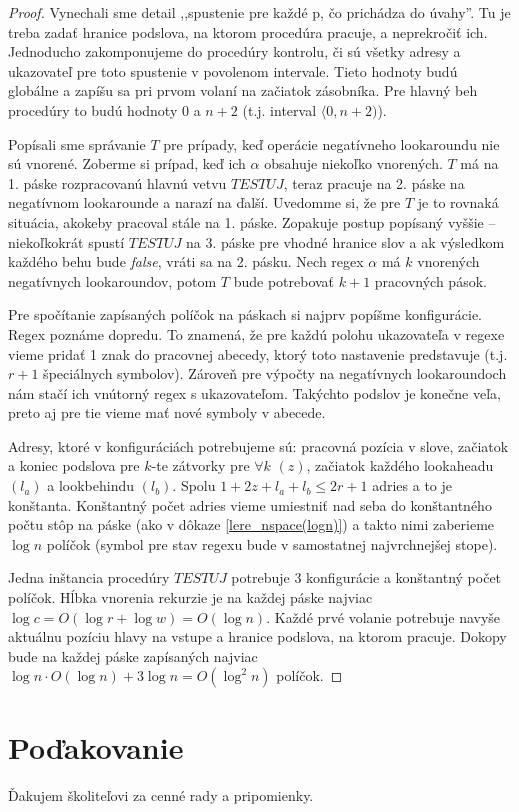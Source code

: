 \documentclass{svk_long_sk}
\begin{document}
\begin{proof}
Vynechali sme detail ,,spustenie pre každé p, čo prichádza do úvahy''. Tu je treba zadať hranice podslova, na ktorom procedúra pracuje, a neprekročiť ich. Jednoducho zakomponujeme do procedúry kontrolu, či sú všetky adresy a ukazovateľ pre toto spustenie v povolenom intervale. Tieto hodnoty budú globálne a zapíšu sa pri prvom volaní na začiatok zásobníka. Pre hlavný beh procedúry to budú hodnoty 0 a $n+2$ (t.j. interval $\langle 0,n+2)$).

Popísali sme správanie $T$ pre prípady, keď operácie negatívneho lookaroundu nie sú vnorené. Zoberme si prípad, keď ich $\alpha$ obsahuje niekoľko vnorených. $T$ má na 1. páske rozpracovanú hlavnú vetvu $TESTUJ$, teraz pracuje na 2. páske na negatívnom lookarounde a narazí na ďalší. Uvedomme si, že pre $T$ je to rovnaká situácia, akokeby pracoval stále na 1. páske. Zopakuje postup popísaný vyššie -- niekoľkokrát spustí $TESTUJ$ na 3. páske pre vhodné hranice slov a ak výsledkom každého behu bude \textit{false}, vráti sa na 2. pásku. Nech regex $\alpha$ má $k$ vnorených negatívnych lookaroundov, potom $T$ bude potrebovať $k+1$ pracovných pások.

Pre spočítanie zapísaných políčok na páskach si najprv popíšme konfigurácie. Regex poznáme dopredu. To znamená, že pre každú polohu ukazovateľa v regexe vieme pridať 1 znak do pracovnej abecedy, ktorý toto nastavenie predstavuje (t.j. $r+1$ špeciálnych symbolov). Zároveň pre výpočty na negatívnych lookaroundoch nám stačí ich vnútorný regex s ukazovateľom. Takýchto podslov je konečne veľa, preto aj pre tie vieme mať nové symboly v abecede. 

Adresy, ktoré v konfiguráciách potrebujeme sú: pracovná pozícia v slove, začiatok a koniec podslova pre $k$-te zátvorky pre $\forall k$ $(z)$, začiatok každého lookaheadu $(l_a)$ a lookbehindu $(l_b)$. Spolu $1+2z+l_a+l_b \leq 2r+1$ adries a to je konštanta. Konštantný počet adries vieme umiestniť nad seba do konštantného počtu stôp na páske (ako v dôkaze \ref{lere_nspace(logn)}) a takto nimi zaberieme $\log n$ políčok (symbol pre stav regexu bude v samostatnej najvrchnejšej stope).

Jedna inštancia procedúry $TESTUJ$ potrebuje 3 konfigurácie a konštantný počet políčok. Hĺbka vnorenia rekurzie je na každej páske najviac $\log c=O(\log r + \log w) = O(\log n)$. Každé prvé volanie potrebuje navyše aktuálnu pozíciu hlavy na vstupe a hranice podslova, na ktorom pracuje. Dokopy bude na každej páske zapísaných najviac $\log n \cdot O(\log n) + 3\log n = O(\log^2n)$ políčok.
\end{proof}


\section*{Poďakovanie}
Ďakujem školiteľovi za cenné rady a pripomienky.


\nocite{*}


\end{document}
